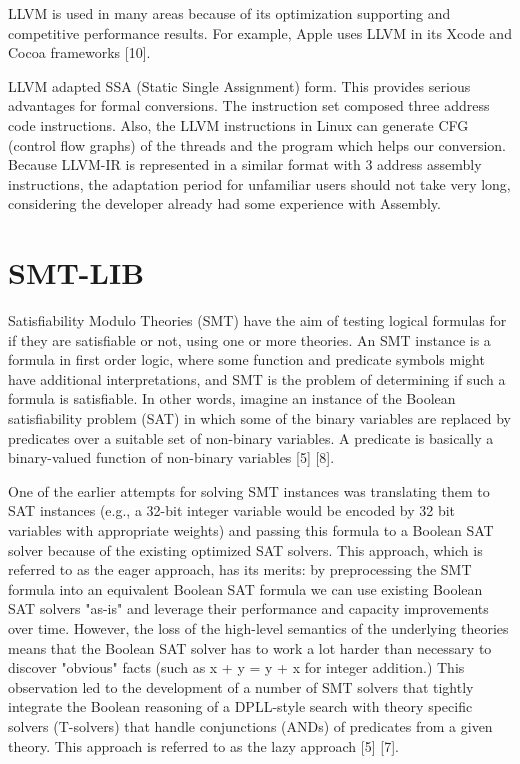 \documentclass[14pt]{article}
\begin{document}
LLVM is used in many areas because of its optimization supporting and competitive performance results. For example, Apple uses LLVM in its Xcode and Cocoa frameworks [10].
					
LLVM adapted SSA (Static Single Assignment) form. This provides serious advantages for formal conversions. The instruction set composed three address code instructions. Also, the LLVM instructions in Linux can generate CFG (control flow graphs) of the threads and the program which helps our conversion. Because LLVM-IR is represented in a similar format with 3 address assembly instructions, the adaptation period for unfamiliar users should not take very long, considering the developer already had some experience with Assembly. 

\section{SMT-LIB}\label{SMT-LIB}
Satisfiability Modulo Theories (SMT) have the aim of testing logical formulas for if they are satisfiable or not, using one or more theories. An SMT instance is a formula in first order logic, where some function and predicate symbols might have additional interpretations, and SMT is the problem of determining if such a formula is satisfiable. In other words, imagine an instance of the Boolean satisfiability problem (SAT) in which some of the binary variables are replaced by predicates over a suitable set of non-binary variables. A predicate is basically a binary-valued function of non-binary variables [5] [8].
					
One of the earlier attempts for solving SMT instances was translating them to SAT instances (e.g., a 32-bit integer variable would be encoded by 32 bit variables with appropriate weights) and passing this formula to a Boolean SAT solver because of the existing optimized SAT solvers. This approach, which is referred to as the eager approach, has its merits: by preprocessing the SMT formula into an equivalent Boolean SAT formula we can use existing Boolean SAT solvers "as-is" and leverage their performance and capacity improvements over time. However, the loss of the high-level semantics of the underlying theories means that the Boolean SAT solver has to work a lot harder than necessary to discover "obvious" facts (such as x + y = y + x for integer addition.) This observation led to the development of a number of SMT solvers that tightly integrate the Boolean reasoning of a DPLL-style search with theory specific solvers (T-solvers) that handle conjunctions (ANDs) of predicates from a given theory. This approach is referred to as the lazy approach [5] [7]. 
\end{document}
